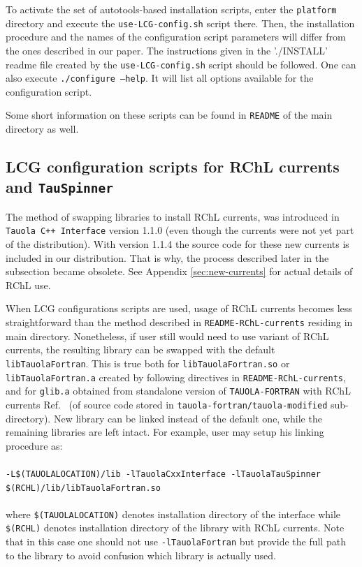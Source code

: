 \documentclass[]{Tauola_interface_design}
\begin{document}
To activate the set of autotools\cite{autotools}-based installation scripts,
enter the {\tt platform} directory and execute the {\tt use-LCG-config.sh} script there.
Then, the installation procedure and the names of the configuration script parameters will differ from the ones 
described in our paper. The instructions given in the './INSTALL' readme file created by the {\tt use-LCG-config.sh} script
should be followed. One can also execute {\tt ./configure --help}. It will 
list all options available for the configuration script.

Some short information on these scripts can be found in {\tt README} of the main directory as well.

\subsection{ LCG configuration scripts for  RChL currents and {\tt TauSpinner} }
\label{sec:autotoolsfornew}


The method of swapping libraries to
 install RChL currents, was introduced in {\tt Tauola C++ Interface} 
version 1.1.0 (even though the currents were not yet part of the
distribution).  
With version 1.1.4 the source code for these new currents is included in our 
distribution. That is why, the process described later in the subsection 
became obsolete.
See Appendix \ref{sec:new-currents} for actual details of RChL use.


When LCG configurations scripts are used, usage of RChL currents becomes less
straightforward than the method described in {\tt README-RChL-currents} residing
in main directory. Nonetheless, if user still would need  to use variant of 
RChL currents,
the resulting library can be swapped with the default {\tt libTauolaFortran}.
This is true both for {\tt libTauolaFortran.so} or {\tt libTauolaFortran.a}
created by following directives in {\tt README-RChL-currents},
and for {\tt glib.a} obtained from standalone version of {\tt TAUOLA-FORTRAN}
with RChL currents Ref.~\cite{Nugent:2013hxa} (of
source code  stored in 
{\tt tauola-fortran/tauola-modified} sub-directory). 
New library can be linked instead of the default one, while
the remaining libraries are left intact. For example, user may setup
his linking procedure as: \\
\\
{\tt -L\$(TAUOLALOCATION)/lib -lTauolaCxxInterface -lTauolaTauSpinner \\
\$(RCHL)/lib/libTauolaFortran.so } \\
\\
where {\tt \$(TAUOLALOCATION)} denotes installation directory of the interface
while {\tt \$(RCHL)} denotes installation directory of the library with RChL
currents. Note that in this case one should not use {\tt -lTauolaFortran}
but provide the full path to the library to avoid confusion  which library
is actually used.
\end{document}
